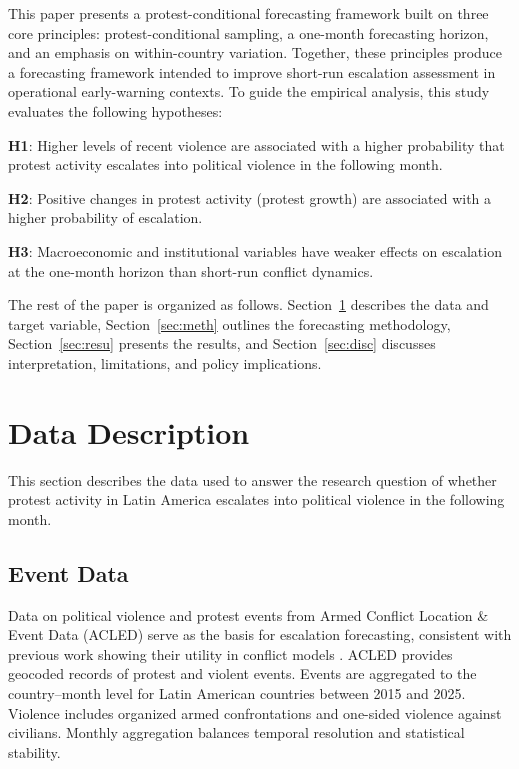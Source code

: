 \documentclass[12pt]{article}
\begin{document}
This paper presents a protest-conditional forecasting framework built on three core principles: protest-conditional sampling, a one-month forecasting horizon, and an emphasis on within-country variation. Together, these principles produce a forecasting framework intended to improve short-run escalation assessment in operational early-warning contexts. To guide the empirical analysis, this study evaluates the following hypotheses:

\textbf{H1}: Higher levels of recent violence are associated with a higher probability that protest activity escalates into political violence in the following month.

\textbf{H2}: Positive changes in protest activity (protest growth) are associated with a higher probability of escalation.

\textbf{H3}: Macroeconomic and institutional variables have weaker effects on escalation at the one-month horizon than short-run conflict dynamics.

The rest of the paper is organized as follows. Section~\ref{sec:data} describes the data and target variable, Section~\ref{sec:meth} outlines the forecasting methodology, Section~\ref{sec:resu} presents the results, and Section~\ref{sec:disc} discusses interpretation, limitations, and policy implications.

\section{Data Description}
\label{sec:data}

This section describes the data used to answer the research question of whether protest activity in Latin America escalates into political violence in the following month.

\subsection{Event Data}

Data on political violence and protest events from Armed Conflict Location \& Event Data (ACLED) serve as the basis for escalation forecasting, consistent with previous work showing their utility in conflict models \citep{rod2024protest_forecasting}. ACLED provides geocoded records of protest and violent events. Events are aggregated to the country--month level for Latin American countries between 2015 and 2025. Violence includes organized armed confrontations and one-sided violence against civilians. Monthly aggregation balances temporal resolution and statistical stability.
\end{document}

